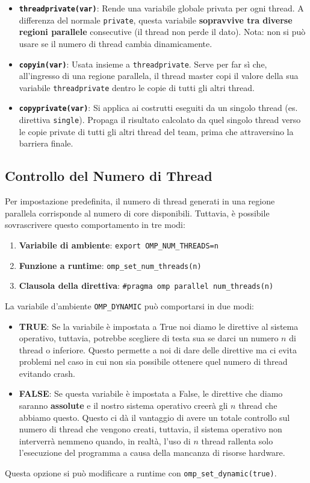 \begin{itemize}
    \item \textbf{\texttt{threadprivate(var)}}: Rende una variabile globale privata per ogni thread. A differenza del normale \texttt{private}, questa variabile \textbf{sopravvive tra diverse regioni parallele} consecutive (il thread non perde il dato). Nota: non si può usare se il numero di thread cambia dinamicamente.
    \item \textbf{\texttt{copyin(var)}}: Usata insieme a \texttt{threadprivate}. Serve per far sì che, all'ingresso di una regione parallela, il thread master copi il valore della sua variabile \texttt{threadprivate} dentro le copie di tutti gli altri thread.
    \item \textbf{\texttt{copyprivate(var)}}: Si applica ai costrutti eseguiti da un singolo thread (es. direttiva \texttt{single}). Propaga il risultato calcolato da quel singolo thread verso le copie private di tutti gli altri thread del team, prima che attraversino la barriera finale.
\end{itemize}

\subsection{Controllo del Numero di Thread}
Per impostazione predefinita, il numero di thread generati in una regione parallela corrisponde al numero di core disponibili. Tuttavia, è possibile sovrascrivere questo comportamento in tre modi:
\begin{enumerate}
    \item \textbf{Variabile di ambiente}: \texttt{export OMP\_NUM\_THREADS=n}
    \item \textbf{Funzione a runtime}: \texttt{omp\_set\_num\_threads(n)}
    \item \textbf{Clausola della direttiva}: \texttt{\#pragma omp parallel num\_threads(n)}
\end{enumerate}

La variabile d'ambiente \texttt{OMP\_DYNAMIC} può comportarsi in due modi:
\begin{itemize}
    \item \textbf{TRUE}: Se la variabile è impostata a True noi diamo le direttive al sistema operativo, tuttavia, potrebbe scegliere di testa sua se darci un numero $n$ di thread o inferiore. Questo permette a noi di dare delle direttive ma ci evita problemi nel caso in cui non sia possibile ottenere quel numero di thread evitando crash.
    \item \textbf{FALSE}: Se questa variabile è impostata a False, le direttive che diamo saranno \textbf{assolute} e il nostro sistema operativo creerà gli $n$ thread che abbiamo questo. Questo ci dà il vantaggio di avere un totale controllo sul numero di thread che vengono creati, tuttavia, il sistema operativo non interverrà nemmeno quando, in realtà, l'uso di $n$ thread rallenta solo l'esecuzione del programma a causa della mancanza di risorse hardware.
\end{itemize}
Questa opzione si può modificare a runtime con \texttt{omp\_set\_dynamic(true)}.

